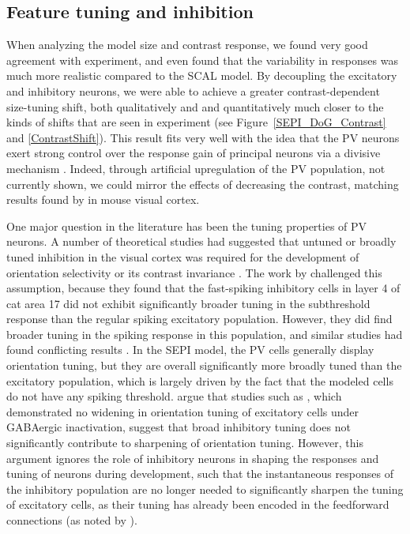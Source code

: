 \subsection{Feature tuning and inhibition}

When analyzing the model size and contrast response, we found very
good agreement with experiment, and even found that the variability in
responses was much more realistic compared to the SCAL model. By
decoupling the excitatory and inhibitory neurons, we were able to
achieve a greater contrast-dependent size-tuning shift, both
qualitatively and and quantitatively much closer to the kinds of
shifts that are seen in experiment (see Figure~\ref{SEPI_DoG_Contrast}
and \ref{ContrastShift}). This result fits very well with the idea
that the PV neurons exert strong control over the response gain of
principal neurons via a divisive mechanism \citep{Wilson2012}. Indeed,
through artificial upregulation of the PV population, not currently
shown, we could mirror the effects of decreasing the contrast,
matching results found by \cite{Nienborg2013} in mouse visual cortex.

One major question in the literature has been the tuning properties of
PV neurons. A number of theoretical studies had suggested that untuned
or broadly tuned inhibition in the visual cortex was required for the
development of orientation selectivity or its contrast invariance
\citep{Somers1995, Troyer1998}. The work by \cite{Cardin2007}
challenged this assumption, because they found that the fast-spiking
inhibitory cells in layer 4 of cat area 17 did not exhibit
significantly broader tuning in the subthreshold response than the
regular spiking excitatory population. However, they did find broader
tuning in the spiking response in this population, and similar studies
had found conflicting results \citep{Hirsch2003, Nowak2008}. In the
SEPI model, the PV cells generally display orientation tuning, but
they are overall significantly more broadly tuned than the excitatory
population, which is largely driven by the fact that the modeled cells
do not have any spiking threshold. \cite{Cardin2007} argue that
studies such as \cite{Nelson1994}, which demonstrated no widening in
orientation tuning of excitatory cells under GABAergic inactivation,
suggest that broad inhibitory tuning does not significantly contribute
to sharpening of orientation tuning. However, this argument ignores
the role of inhibitory neurons in shaping the responses and tuning of
neurons during development, such that the instantaneous responses of
the inhibitory population are no longer needed to significantly
sharpen the tuning of excitatory cells, as their tuning has already
been encoded in the feedforward connections (as noted by
\citealt{Miikkulainen2005}).

